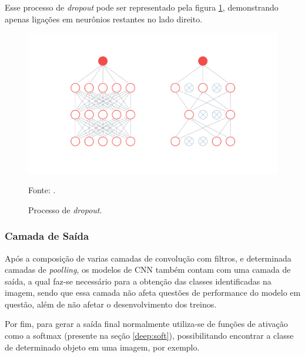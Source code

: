 Esse processo de \textit{dropout} pode ser representado pela figura \ref{deep:fig:9}, demonstrando apenas ligações em neurônios restantes no lado direito.

\begin{figure}[H]
    \centering
    \caption{Processo de \textit{dropout}.}
    \includegraphics[width=1\linewidth]{recursos/imagens/deep/dropout.png}
    \label{deep:fig:9}
    
    \vspace*{1 cm}
    Fonte: \cite{PeltarionAI}.
\end{figure}


\subsubsection{Camada de Saída}
\label{deep:output}

Após a composição de varias camadas de convolução com filtros, e determinada camadas de \textit{poolling}, os modelos de CNN também contam com uma camada de saída, a qual faz-se necessário para a obtenção das classes identificadas na imagem, sendo que essa camada não afeta questões de performance do modelo em questão, além de não afetar o desenvolvimento dos treinos.

Por fim, para gerar a saída final normalmente utiliza-se de funções de ativação como a softmax (presente na seção \ref{deep:soft}), possibilitando encontrar a classe de determinado objeto em uma imagem, por exemplo.